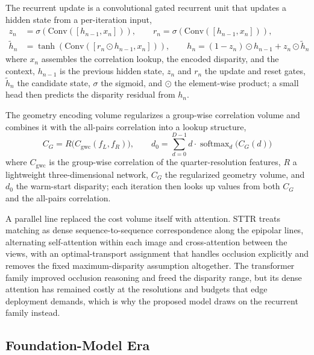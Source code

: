 The recurrent update is a convolutional gated recurrent unit that updates
a hidden state from a per-iteration input,
\begin{equation}
\begin{aligned}
z_n &= \sigma(\mathrm{Conv}([h_{n-1}, x_n])), \qquad
r_n = \sigma(\mathrm{Conv}([h_{n-1}, x_n])),\\
\tilde{h}_n &= \tanh(\mathrm{Conv}([r_n \odot h_{n-1}, x_n])), \qquad
h_n = (1 - z_n)\odot h_{n-1} + z_n \odot \tilde{h}_n
\end{aligned}
\label{eq:convgru_lit}
\end{equation}
where $x_n$ assembles the correlation lookup, the encoded disparity, and
the context, $h_{n-1}$ is the previous hidden state, $z_n$ and $r_n$ the
update and reset gates, $\tilde{h}_n$ the candidate state, $\sigma$ the
sigmoid, and $\odot$ the element-wise product; a small head then predicts
the disparity residual from $h_n$.

The geometry encoding volume regularizes a group-wise correlation volume
and combines it with the all-pairs correlation into a lookup structure,
\begin{equation}
C_G = R\big(C_{\mathrm{gwc}}(f_{L}, f_{R})\big), \qquad
d_0 = \sum_{d=0}^{D-1} d \cdot \operatorname{softmax}_d\!\big(C_G(d)\big)
\label{eq:gev_lit}
\end{equation}
where $C_{\mathrm{gwc}}$ is the group-wise correlation of the
quarter-resolution features, $R$ a lightweight three-dimensional network,
$C_G$ the regularized geometry volume, and $d_0$ the warm-start disparity;
each iteration then looks up values from both $C_G$ and the all-pairs
correlation.

A parallel line replaced the cost volume itself with attention. STTR
\cite{li2021sttr} treats matching as dense sequence-to-sequence
correspondence along the epipolar lines, alternating self-attention
within each image and cross-attention between the views, with an
optimal-transport assignment that handles occlusion explicitly and
removes the fixed maximum-disparity assumption altogether. The
transformer family improved occlusion reasoning and freed the disparity
range, but its dense attention has remained costly at the resolutions
and budgets that edge deployment demands, which is why the proposed
model draws on the recurrent family instead.

\FloatBarrier
\subsection{Foundation-Model Era}

